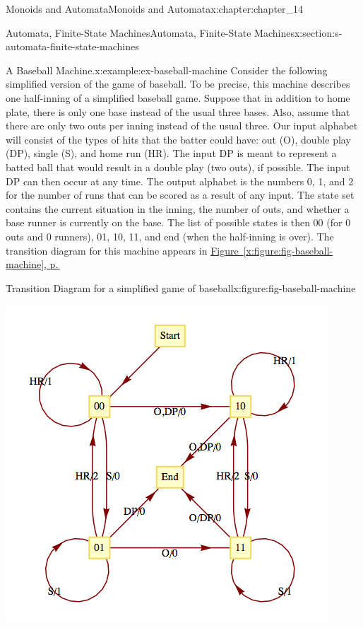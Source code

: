 \documentclass[twoside,10pt,]{book}
\newcommand{\xreffont}{\relax}
\numberwithin{equation}{section}
\begin{document}
\begin{chapterptx}{Monoids and Automata}{}{Monoids and Automata}{}{}{x:chapter:chapter_14}
\begin{sectionptx}{Automata, Finite-State Machines}{}{Automata, Finite-State Machines}{}{}{x:section:s-automata-finite-state-machines}
\begin{example}{A Baseball Machine.}{x:example:ex-baseball-machine}
Consider the following simplified version of the game of baseball. To be precise, this machine describes one half-inning of a simplified baseball game. Suppose that in addition to home plate, there is only one base instead of the usual three bases. Also, assume that there are only two outs per inning instead of the usual three. Our input alphabet will consist of the types of hits that the batter could have: out (O), double play (DP), single (S), and home run (HR). The input DP is meant to represent a batted ball that would result in a double play (two outs), if possible. The input DP can then occur at any time. The output alphabet is the numbers 0, 1, and 2 for the number of runs that can be scored as a result of any input. The state set contains the current situation in the inning, the number of outs, and whether a base runner is currently on the base. The list of possible states is then 00 (for 0 outs and 0 runners), 01, 10, 11, and end (when the half-inning is over). The transition diagram for this machine appears in \hyperref[x:figure:fig-baseball-machine]{Figure~{\xreffont\ref{x:figure:fig-baseball-machine}}, p.\,\pageref{x:figure:fig-baseball-machine}}%
\begin{figureptx}{Transition Diagram for a simplified game of baseball}{x:figure:fig-baseball-machine}{}%
\begin{image}{0.15}{0.7}{0.15}%
\includegraphics[width=\linewidth]{images/fig-baseball-machine.png}

\end{image}
\end{figureptx}
\end{example}
\end{sectionptx}
\end{chapterptx}
\end{document}
